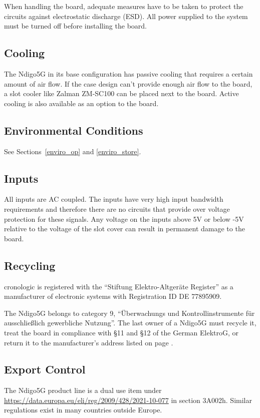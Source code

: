 	When handling the board, adequate measures have to be taken to protect the circuits against electrostatic discharge (ESD). All power supplied to the system must be turned off before installing the board.

\subsection{Cooling}

	The Ndigo5G in its base configuration has passive cooling that requires a certain amount of air flow. If the case design can't provide enough air flow to the board, a slot cooler like Zalman ZM-SC100 can be placed next to the board. Active cooling is also available as an option to the board.

\subsection{Environmental Conditions}
	See Sections~\ref{enviro_op} and \ref{enviro_store}.

\subsection{Inputs}

	All inputs are AC coupled. The inputs have very high input bandwidth requirements and therefore there are no circuits that provide over voltage protection for these signals. Any voltage on the inputs above 5V or below -5V relative to the voltage of the slot cover can result in permanent damage to the board.

\subsection{Recycling}

	cronologic is registered with the ``Stiftung Elektro-Altger\"a{}te Register'' as a manufacturer of electronic systems with Registration ID DE 77895909.\par

	The Ndigo5G belongs to category 9, ``\"U{}berwachungs und Kontrollinstrumente f\"u{}r aus\-schlie\ss lich gewerbliche Nutzung''. The last owner of a Ndigo5G must recycle it, treat the board in compliance with \S{}11 and \S{}12 of the German ElektroG, or return it to the manufacturer's address listed on page \pageref{cp:manu}.
	
\subsection{Export Control}
The Ndigo5G product line is a dual use item under \href{Council Regulation (EC) No 428/2009 of 5 May 2009 setting up a Community regime for the control of exports, transfer, brokering and transit of dual-use items}{https://data.europa.eu/eli/reg/2009/428/2021-10-077} in section 3A002h. Similar regulations exist in many countries outside Europe.

